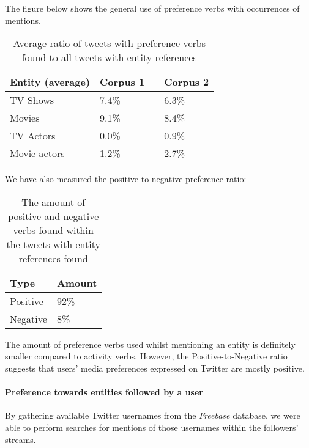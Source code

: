 The figure below shows the general use of preference verbs with occurrences of
mentions.

\begin{center}
  \begin{table}[h!b!p!]
    \begin{tabular}{ | p{4cm} | p{2cm} | p{1cm}| p{2cm} | } \hline
      Entity (average) & Corpus 1 & & Corpus 2 \\ \hline
      TV Shows & 7.4\% & & 6.3\% \\ \hline
      Movies & 9.1\% & & 8.4\% \\ \hline
      TV Actors & 0.0\% & & 0.9\% \\ \hline
      Movie actors & 1.2\% & & 2.7\% \\ \hline
    \end{tabular}
    \caption{Average ratio of tweets with preference verbs found to all tweets with entity references}
  \end{table}
\end{center}

We have also measured the positive-to-negative preference ratio:

\begin{center}
  \begin{table}[h!b!p!]
    \begin{tabular}{ | p{3cm}| p{2cm} | } \hline
      Type & Amount \\ \hline
      Positive & 92\% \\ \hline
      Negative & 8\% \\ \hline
    \end{tabular}
    \caption{The amount of positive and negative verbs found within the tweets with entity references found}
  \end{table}
\end{center}

The amount of preference verbs used whilst mentioning an entity is definitely
smaller compared to activity verbs. However, the Positive-to-Negative ratio suggests that users'
media preferences expressed on Twitter are mostly positive.

\paragraph{Preference towards entities followed by a user}
By gathering available Twitter usernames from the \textit{Freebase} database,
we were able to perform searches for mentions of those usernames within the followers' streams.

